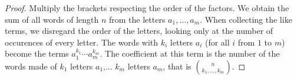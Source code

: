 

\setcounter{section}{4}
\setcounter{subsection}{3}
\setcounter{dfn}{2}

\begin{proof}
Multiply the brackets respecting the order of the factors.
We obtain the sum of all words of length $n$ from the letters $a_1, \ldots, a_m$.
When collecting the like terms, we disregard the order of the letters, looking only at the number of occurences of every letter.
The words with $k_i$ letters $a_i$ (for all $i$ from $1$ to $m$) become the terms $a_1^{k_1} \cdots a_m^{k_m}$.
The coefficient at this term is the number of the words made of $k_1$ letters $a_1$,... $k_m$ letters $a_m$,
that is $\binom{n}{k_1, \ldots, k_m}$.
\end{proof}




